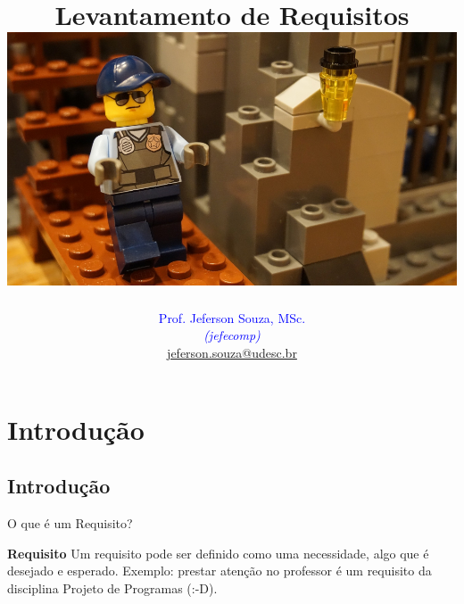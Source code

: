 \documentclass[xcolor=x11names,compress]{beamer}
\begin{document}
\title[Levantamento de Requisitos \hskip35mm \insertframenumber / \inserttotalframenumber  \hskip32mm \inserttitlegraphic]{Levantamento de Requisitos \\[4mm]
\includegraphics[keepaspectratio,width=.5\textwidth]{lego-ppr}}
\author[@2018 Prof. Jeferson Souza, MSc (jefecomp) - All rights reserved.]{
	\textcolor{blue}{Prof. Jeferson Souza, MSc.} \\[1mm] 
	\textcolor{blue}{\textit{{\footnotesize (jefecomp) }}}\\[1.5mm]
	 \underline{{\footnotesize jeferson.souza@udesc.br}}
	 \vspace*{1mm}
}

\date{}


\begin{frame}
\titlepage
\end{frame}

\section{Introdução}
\subsection{Introdução}
\begin{frame}{O que é um Requisito?}

\begin{alertblock}{\textbf{Requisito}}
Um requisito pode ser definido como uma necessidade, algo que é desejado e esperado. Exemplo: prestar atenção no professor é um requisito da disciplina Projeto de Programas (:-D).
\end{alertblock}

\end{frame}
\end{document}
